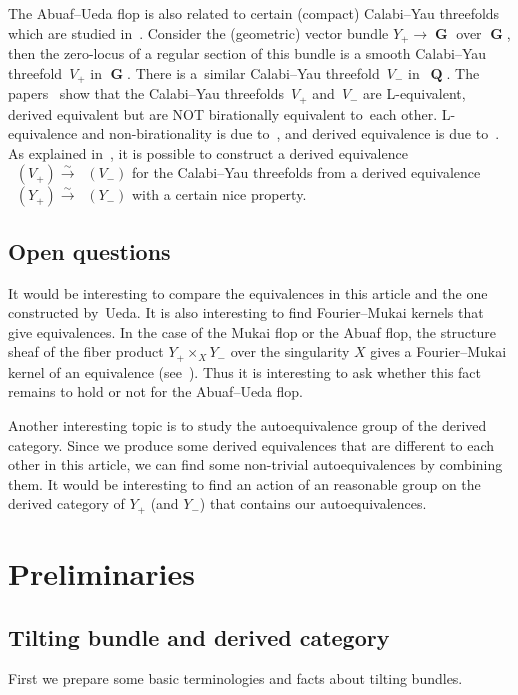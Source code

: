\documentclass[11pt]{article}
\DeclareMathOperator{\D}{D^b}
\DeclareMathOperator{\G}{\mathbf{G}}
\DeclareMathOperator{\Q}{\mathbf{Q}}
\numberwithin{equation}{section}
\begin{document}
The Abuaf--Ueda flop is also related to certain (compact) Calabi--Yau threefolds which are studied in~\cite{IMOU16a, IMOU16b, Kuz18}.
Consider the (geometric) vector bundle $Y_+ \to \G$ over $\G$,
then the zero-locus of a regular section of this bundle is a smooth Calabi--Yau threefold~$V_+$ in $\G$.
There is a~similar Calabi--Yau threefold~$V_-$ in~$\Q$.
The papers~\cite{IMOU16b, Kuz18} show that the Calabi--Yau threefolds~$V_+$ and~$V_-$ are L-equivalent, derived equivalent
but are NOT birationally equivalent to~each other.
L-equivalence and non-birationality is due to~\cite{IMOU16b}, and derived equivalence is due to~\cite{Kuz18}.
As explained in~\cite{Ued16}, it is possible to construct a derived equivalence $\D(V_+) \xrightarrow{\sim} \D(V_-)$
for the Calabi--Yau threefolds from a derived equivalence $\D(Y_+) \xrightarrow{\sim} \D(Y_-)$ with a certain nice property.

\subsection{Open questions}
It would be interesting to compare the equivalences in this article and the one constructed by~Ueda.
It is also interesting to find Fourier--Mukai kernels that give equivalences.
In the case of the Mukai flop or the Abuaf flop, the structure sheaf of the fiber product $Y_+ \times_X Y_-$ over the singularity $X$
gives a Fourier--Mukai kernel of an equivalence (see~\cite{H17b, Ka02, Na03}).
Thus it is interesting to ask whether this fact remains to hold or not for the Abuaf--Ueda flop.

Another interesting topic is to study the autoequivalence group of the derived category.
Since we produce some derived equivalences that are different to each other in this article, we can find some non-trivial autoequivalences
by combining them.
It would be interesting to find an action of an reasonable group on the derived category of $Y_+$ (and $Y_-$)
that contains our autoequivalences.
\section{Preliminaries}

\subsection{Tilting bundle and derived category}

First we prepare some basic terminologies and facts about tilting bundles.
\end{document}
